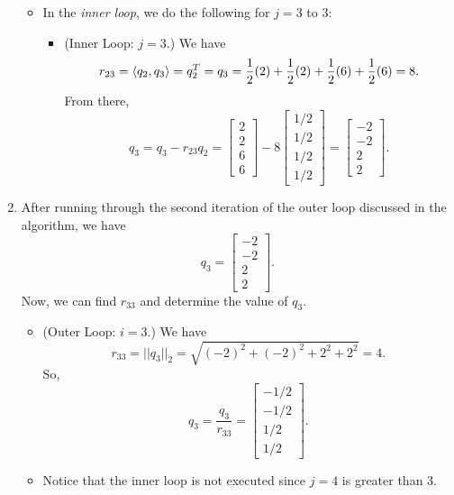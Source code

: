 \documentclass[letterpaper]{article}
\begin{document}
\begin{mdframed}
\begin{enumerate}
\begin{itemize}
            \item In the \emph{inner loop}, we do the following for $j = 3$ to $3$:
            \begin{itemize}
                \item (Inner Loop: $j = 3$.) We have 
                \[r_{23} = \langle q_2, q_3 \rangle = q_2^T = q_3 = \frac{1}{2}(2) + \frac{1}{2}(2) + \frac{1}{2}(6) + \frac{1}{2}(6) = 8.\]
                From there, 
                \[q_3 = q_3 - r_{23}q_2 = \begin{bmatrix}
                    2\\2\\6\\6
                \end{bmatrix} - 8\begin{bmatrix}
                    1/2 \\ 1/2 \\ 1/2 \\ 1/2
                \end{bmatrix} = \begin{bmatrix}
                    -2 \\ -2 \\ 2 \\ 2
                \end{bmatrix}.\]
            \end{itemize}
        \end{itemize}

        \item After running through the second iteration of the outer loop discussed in the algorithm, we have 
        \[q_3 = \begin{bmatrix}
            -2 \\ -2 \\ 2 \\ 2
        \end{bmatrix}.\]
        Now, we can find $r_{33}$ and determine the value of $q_3$. 
        \begin{itemize}
            \item (Outer Loop: $i = 3$.) We have 
            \[r_{33} = ||q_3||_2 = \sqrt{(-2)^2 + (-2)^2 + 2^2 + 2^2} = 4.\]
            So, 
            \[q_3 = \frac{q_3}{r_{33}} = \begin{bmatrix}
                -1/2 \\ -1/2 \\ 1/2 \\ 1/2
            \end{bmatrix}.\]

            \item Notice that the inner loop is not executed since $j = 4$ is greater than $3$.
        \end{itemize}
    \end{enumerate}
\end{mdframed}
\end{document}

